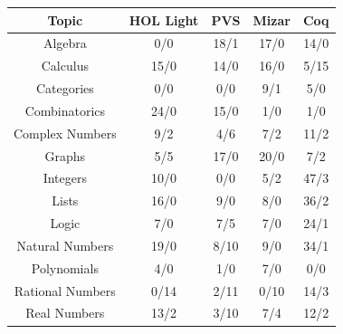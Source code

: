 \begin{table}[ht]\centering\footnotesize
	\begin{tabular}{|c|c|c|c|c|}
	  \hline 
	   Topic & HOL Light & PVS & Mizar & Coq\\
		\hline \textsf{Algebra}& \textsf{0/0} & \textsf{18/1} & \textsf{17/0} & \textsf{14/0}\\
		\hline \textsf{Calculus}& \textsf{15/0} & \textsf{14/0} & \textsf{16/0} & \textsf{5/15}  \\
		\hline \textsf{Categories} & \textsf{0/0} & \textsf{0/0} & \textsf{9/1} & \textsf{5/0}\\
		\hline \textsf{Combinatorics}& \textsf{24/0} & \textsf{15/0} & \textsf{1/0} & \textsf{1/0}  \\
		\hline \textsf{Complex Numbers} & \textsf{9/2} & \textsf{4/6} & \textsf{7/2} & \textsf{11/2}\\
		\hline \textsf{Graphs} & \textsf{5/5} & \textsf{17/0} & \textsf{20/0} & \textsf{7/2}\\
		\hline \textsf{Integers}& \textsf{10/0 }& \textsf{0/0 }& \textsf{5/2} & \textsf{47/3} \\
		\hline \textsf{Lists}& \textsf{16/0} & \textsf{9/0} & \textsf{8/0} & \textsf{36/2} \\
		\hline \textsf{Logic}& \textsf{7/0} & \textsf{7/5} & \textsf{7/0}& \textsf{24/1} \\
		\hline \textsf{Natural Numbers} & \textsf{19/0} & \textsf{8/10} & \textsf{9/0}& \textsf{34/1}  \\
		\hline \textsf{Polynomials} & \textsf{4/0} & \textsf{1/0} & \textsf{7/0}& \textsf{0/0}  \\
		\hline \textsf{Rational Numbers} & \textsf{0/14} & \textsf{2/11} & \textsf{0/10}& \textsf{14/3}  \\
		\hline \textsf{Real Numbers}  & \textsf{13/2} & \textsf{3/10} & \textsf{7/4} & \textsf{12/2}\\

\end{tabular}
\end{table}
